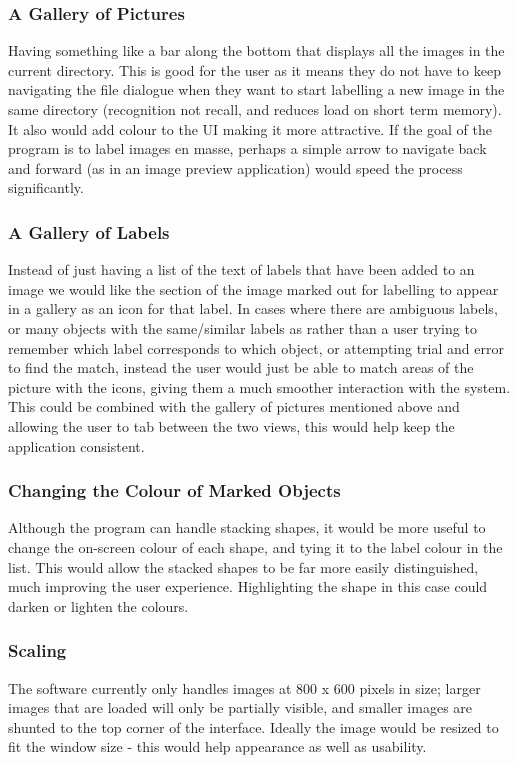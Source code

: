 \documentclass[a4paper,11pt,oneside]{article}
\begin{document}
\subsubsection{A Gallery of Pictures} 
Having something like a bar along the bottom that displays all the images in the
current directory.  This is good for the user as it means they do not have to
keep navigating the file dialogue when they want to start labelling a new image
in the same directory (recognition not recall, and reduces load on short term
memory).  It also would add colour to the UI making it more attractive. If the
goal of the program is to label images en masse, perhaps a simple arrow to
navigate back and forward (as in an image preview application) would speed the
process significantly.

\subsubsection{A Gallery of Labels}
Instead of just having a list of the text of labels that have been added to an
image we would like the section of the image marked out for labelling to appear
in a gallery as an icon for that label.  In cases where there are ambiguous
labels, or many objects with the same/similar labels as rather than a user
trying to remember which label corresponds to which object, or attempting trial
and error to find the match, instead the user would just be able to match areas
of the picture with the icons, giving them a much smoother interaction with the
system.  This could be combined with the gallery of pictures mentioned above and
allowing the user to tab between the two views, this would help keep the
application consistent.

\subsubsection{Changing the Colour of Marked Objects}
Although the program can handle stacking shapes, it would be more useful to
change the on-screen colour of each shape, and tying it to the label colour in
the list.  This would allow the stacked shapes to be far more easily distinguished,
much improving the user experience. Highlighting the shape in this case could
darken or lighten the colours.

\subsubsection{Scaling}
The software currently only handles images at 800 x 600 pixels in size;
larger images that are loaded will only be partially visible, and smaller
images are shunted to the top corner of the interface. Ideally the image would
be resized to fit the window size - this would help appearance as well as
usability.
\end{document}
